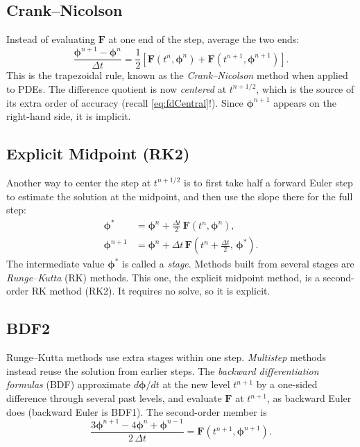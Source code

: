 \subsection{Crank--Nicolson}
\label{sec:ts-CN}

Instead of evaluating $\mathbf{F}$ at one end of the step, average the two ends:
\begin{equation}
  \frac{\boldsymbol{\phi}^{n+1} - \boldsymbol{\phi}^n}{\Delta t}
  = \frac12\left[\mathbf{F}(t^n,\boldsymbol{\phi}^n) + \mathbf{F}(t^{n+1},\boldsymbol{\phi}^{n+1})\right].
  \label{eq:ts-CN}
\end{equation}
This is the trapezoidal rule, known as the \emph{Crank--Nicolson} method when applied to PDEs. The difference quotient is now
\emph{centered} at $t^{n+1/2}$, which is the source of its extra order of accuracy (recall \eqref{eq:fdCentral}!). Since $\boldsymbol{\phi}^{n+1}$ appears on the
right-hand side, it is implicit.


\subsection{Explicit Midpoint (RK2)}
\label{sec:ts-RK2}

Another way to center the step at $t^{n+1/2}$ is to first take half a forward Euler step
to estimate the solution at the midpoint, and then use the slope there for the full step:
\begin{align}
  \boldsymbol{\phi}^{*} &= \boldsymbol{\phi}^n + \frac{\Delta t}{2}\,\mathbf{F}(t^n, \boldsymbol{\phi}^n),
  \label{eq:ts-RK2a}\\
  \boldsymbol{\phi}^{n+1} &= \boldsymbol{\phi}^n + \Delta t\,\mathbf{F}\!\left(t^n + \tfrac{\Delta t}{2},\, \boldsymbol{\phi}^{*}\right).
  \label{eq:ts-RK2b}
\end{align}
The intermediate value $\boldsymbol{\phi}^*$ is called a \emph{stage}. Methods built from several
stages are \emph{Runge--Kutta} (RK) methods. This one, the explicit midpoint method, is a
second-order RK method (RK2). It requires no solve, so it is explicit.


\subsection{BDF2}
\label{sec:ts-BDF2}

Runge--Kutta methods use extra stages within one step. \emph{Multistep} methods instead
reuse the solution from earlier steps. The \emph{backward differentiation formulas} (BDF) approximate
$d\boldsymbol{\phi}/dt$ at the new level $t^{n+1}$ by a one-sided difference through
several past levels, and evaluate $\mathbf{F}$ at $t^{n+1}$, as backward Euler does
(backward Euler is BDF1). The second-order member is
\begin{equation}
  \frac{3\boldsymbol{\phi}^{n+1} - 4\boldsymbol{\phi}^{n} + \boldsymbol{\phi}^{n-1}}{2\,\Delta t}
  = \mathbf{F}(t^{n+1},\boldsymbol{\phi}^{n+1}).
  \label{eq:ts-BDF2}
\end{equation}

